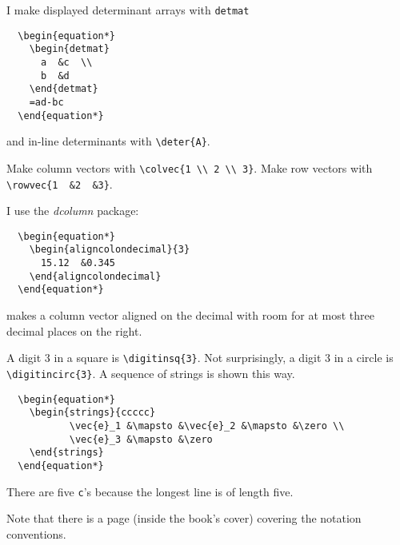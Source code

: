 \documentclass[titlepage]{article}
\begin{document}
\begin{description}
  I make displayed determinant arrays with \verb!detmat! 
\begin{verbatim}
  \begin{equation*}
    \begin{detmat}
      a  &c  \\
      b  &d   
    \end{detmat}
    =ad-bc
  \end{equation*}
\end{verbatim}
  and in-line  determinants with \verb!\deter{A}!.

\item[vectors]
  Make column vectors with \verb|\colvec{1 \\ 2 \\ 3}|.
  Make row vectors with \verb|\rowvec{1  &2  &3}|.

\item[decimal point-aligned columns]
  I use the \textit{dcolumn} package:
\begin{verbatim}
  \begin{equation*}
    \begin{aligncolondecimal}{3}
      15.12  &0.345    
    \end{aligncolondecimal}
  \end{equation*}
\end{verbatim}
  makes a column vector aligned on the decimal with room for at most 
  three decimal places on the right.


\item[strings]
  A digit $3$ in a square is \verb!\digitinsq{3}!.
  Not surprisingly, a digit $3$ in a circle is \verb!\digitincirc{3}!.
  A sequence of strings is shown this way.
\begin{verbatim}
  \begin{equation*}
    \begin{strings}{ccccc}
           \vec{e}_1 &\mapsto &\vec{e}_2 &\mapsto &\zero \\
           \vec{e}_3 &\mapsto &\zero
    \end{strings}
  \end{equation*}
\end{verbatim}
  There are five \verb!c!'s because the longest line
  is of length five.

  


\item[names for things]
  Note that there is a page (inside the book's cover) 
  covering the notation conventions.


\end{description}
\end{document}
